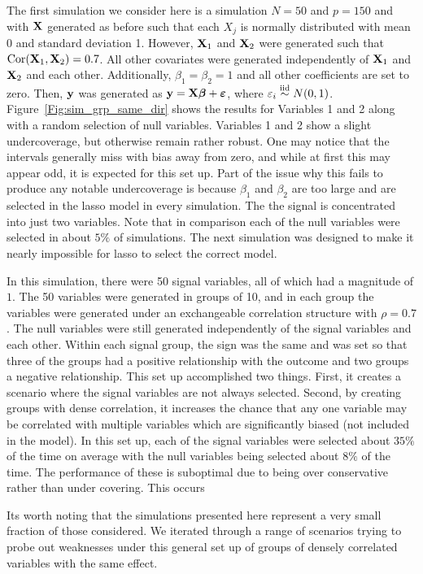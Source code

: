 The first simulation we consider here is a simulation $N = 50$ and $p = 150$ and with $\mathbf{X}$ generated as before such that each $X_j$ is normally distributed with mean 0 and standard deviation 1. However, $\mathbf{X}_1$ and $\mathbf{X}_2$ were generated such that $\textrm{Cor}(\mathbf{X}_1, \mathbf{X}_2) = 0.7$. All other covariates were generated independently of $\mathbf{X}_1$ and $\mathbf{X}_2$ and each other. Additionally, $\beta_1 = \beta_2 = 1$ and all other coefficients are set to zero. Then, $\mathbf{y}$ was generated as $\mathbf{y} = \mathbf{X}\boldsymbol{\beta} + \boldsymbol{\varepsilon}$, where $\varepsilon_i \overset{\text{iid}}{\sim} N(0, 1)$. Figure~\ref{Fig:sim_grp_same_dir} shows the results for Variables 1 and 2 along with a random selection of null variables. Variables 1 and 2 show a slight undercoverage, but otherwise remain rather robust. One may notice that the intervals generally miss with bias away from zero, and while at first this may appear odd, it is expected for this set up. Part of the issue why this fails to produce any notable undercoverage is because $\beta_1$ and $\beta_2$ are too large and are selected in the lasso model in every simulation. The the signal is concentrated into just two variables. Note that in comparison each of the null variables were selected in about $5\%$ of simulations. The next simulation was designed to make it nearly impossible for lasso to select the correct model. 

In this simulation, there were 50 signal variables, all of which had a magnitude of $1$. The 50 variables were generated in groups of 10, and in each group the variables were generated under an exchangeable correlation structure with $\rho = 0.7$. The null variables were still generated independently of the signal variables and each other. Within each signal group, the sign was the same and was set so that three of the groups had a positive relationship with the outcome and two groups a negative relationship. This set up accomplished two things. First, it creates a scenario where the signal variables are not always selected. Second, by creating groups with dense correlation, it increases the chance that any one variable may be correlated with multiple variables which are significantly biased (not included in the model). In this set up, each of the signal variables were selected about $35\%$ of the time on average with the null variables being selected about $8\%$ of the time. The performance of these is suboptimal due to being over conservative rather than under covering. This occurs 

Its worth noting that the simulations presented here represent a very small fraction of those considered. We iterated through a range of scenarios trying to probe out weaknesses under this general set up of groups of densely correlated variables with the same effect.

